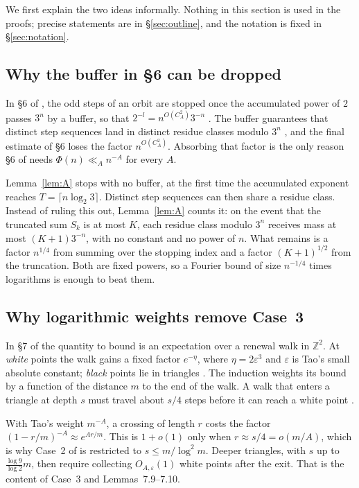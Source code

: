 \documentclass[11pt]{amsart}
\theoremstyle{remark}
\newcommand{\Z}{\mathbb{Z}}
\newcommand{\T}[1]{\cite[#1]{Tao22}}   %
\newcommand{\Tc}{\cite{Tao22}}         %
\theoremstyle{plain}
\begin{document}
We first explain the two ideas informally. Nothing in this section is used in the proofs; precise statements are in \S\ref{sec:outline}, and the notation is fixed in \S\ref{sec:notation}.

\subsection{Why the buffer in \S6 can be dropped}

In \S6 of \Tc, the odd steps of an orbit are stopped once the accumulated power of $2$ passes $3^n$ by a buffer, so that $2^{-l}=n^{O(C_A^2)}3^{-n}$ \T{(6.6)--(6.8)}. The buffer guarantees that distinct step sequences land in distinct residue classes modulo $3^n$ \T{Corollary 6.3}, and the final estimate of \S6 loses the factor $n^{O(C_A^2)}$. Absorbing that factor is the only reason \S6 of \Tc{} needs $\Phi(n)\ll_A n^{-A}$ for every $A$.

Lemma~\ref{lem:A} stops with no buffer, at the first time the accumulated exponent reaches $T=\lceil n\log_2 3\rceil$. Distinct step sequences can then share a residue class. Instead of ruling this out, Lemma~\ref{lem:A} counts it: on the event that the truncated sum $S_k$ is at most $K$, each residue class modulo $3^n$ receives mass at most $(K+1)3^{-n}$, with no constant and no power of $n$. What remains is a factor $n^{1/4}$ from summing over the stopping index and a factor $(K+1)^{1/2}$ from the truncation. Both are fixed powers, so a Fourier bound of size $n^{-1/4}$ times logarithms is enough to beat them.

\subsection{Why logarithmic weights remove Case~3}

In \S7 of \Tc{} the quantity to bound is an expectation over a renewal walk in $\Z^2$. At \emph{white} points the walk gains a fixed factor $e^{-\eta}$, where $\eta=2\varepsilon^3$ and $\varepsilon$ is Tao's small absolute constant; \emph{black} points lie in triangles \T{Lemma 7.4}. The induction weights its bound by a function of the distance $m$ to the end of the walk. A walk that enters a triangle at depth $s$ must travel about $s/4$ steps before it can reach a white point \T{(7.48), (7.50)}.

With Tao's weight $m^{-A}$, a crossing of length $r$ costs the factor $(1-r/m)^{-A}\approx e^{Ar/m}$. This is $1+o(1)$ only when $r\approx s/4=o(m/A)$, which is why Case~2 of \Tc{} is restricted to $s\le m/\log^2m$. Deeper triangles, with $s$ up to $\frac{\log9}{\log2}m$, then require collecting $O_{A,\varepsilon}(1)$ white points after the exit. That is the content of Case~3 and Lemmas~7.9--7.10.
\end{document}
